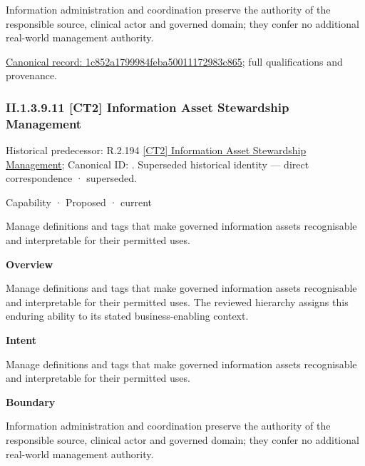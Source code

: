 Information administration and coordination preserve the authority of the responsible source, clinical actor and governed domain; they confer no additional real-world management authority.


{\footnotesize \href{../../../../continuum/strategy/capability/1c852a1799984feba50011172983c865.md}{Canonical record: 1c852a1799984feba50011172983c865}; full qualifications and provenance.}\par
\subsubsection*{II.1.3.9.11 [CT2] Information Asset Stewardship Management}
\label{navigation:II.1.3.9.11}

{\small Historical predecessor: R.2.194 \hyperref[element:cee085c690314802851de71f4741d8db]{[CT2] Information Asset Stewardship Management}; Canonical ID: \texttt{}. Superseded historical identity — direct correspondence · superseded.}\par
\label{element:5bac15316d8d4f4db6e7a253f1acfbe3}
{\small Capability · Proposed · current}\par

Manage definitions and tags that make governed information assets recognisable and interpretable for their permitted uses.



\textbf{Overview}



Manage definitions and tags that make governed information assets recognisable and interpretable for their permitted uses. The reviewed hierarchy assigns this enduring ability to its stated business-enabling context.



\textbf{Intent}



Manage definitions and tags that make governed information assets recognisable and interpretable for their permitted uses.



\textbf{Boundary}



Information administration and coordination preserve the authority of the responsible source, clinical actor and governed domain; they confer no additional real-world management authority.


